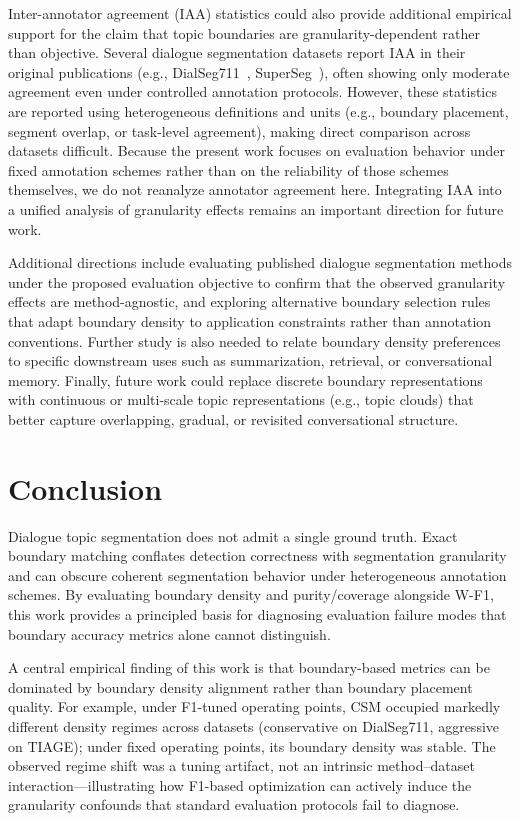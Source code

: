 \documentclass{article}
\begin{document}
Inter-annotator agreement (IAA) statistics could also provide
additional empirical support for the claim that topic boundaries are
granularity-dependent rather than objective. Several dialogue
segmentation datasets report IAA in their original publications (e.g.,
DialSeg711~\cite{xu2021topicaware},
SuperSeg~\cite{jiang2023superdialseg}), often showing only moderate
agreement even under controlled annotation protocols. However, these
statistics are reported using heterogeneous definitions and units
(e.g., boundary placement, segment overlap, or task-level agreement),
making direct comparison across datasets difficult. Because the
present work focuses on evaluation behavior under fixed annotation
schemes rather than on the reliability of those schemes themselves, we
do not reanalyze annotator agreement here. Integrating IAA into a
unified analysis of granularity effects remains an important direction
for future work.

Additional directions include evaluating published dialogue
segmentation methods under the proposed evaluation objective to
confirm that the observed granularity effects are method-agnostic, and
exploring alternative boundary selection rules that adapt boundary
density to application constraints rather than annotation conventions.
Further study is also needed to relate boundary density preferences to
specific downstream uses such as summarization, retrieval, or
conversational memory. Finally, future work could replace discrete
boundary representations with continuous or multi-scale topic
representations (e.g., topic clouds) that better capture overlapping,
gradual, or revisited conversational structure.

\section{Conclusion}
\label{sec:conclusion}
Dialogue topic segmentation does not admit a single ground truth.
Exact boundary matching conflates detection correctness with
segmentation granularity and can obscure coherent segmentation behavior
under heterogeneous annotation schemes.
By evaluating boundary density and purity/coverage alongside W-F1,
this work provides a principled basis for diagnosing evaluation failure
modes that boundary accuracy metrics alone cannot distinguish.

A central empirical finding of this work is that boundary-based metrics
can be dominated by boundary density alignment rather than boundary
placement quality.
For example, under F1-tuned operating points, CSM occupied markedly
different density regimes across datasets (conservative on DialSeg711,
aggressive on TIAGE); under fixed operating points, its boundary
density was stable. The observed regime shift was a tuning artifact,
not an intrinsic method--dataset interaction---illustrating how
F1-based optimization can actively induce the granularity confounds
that standard evaluation protocols fail to diagnose.
\end{document}
